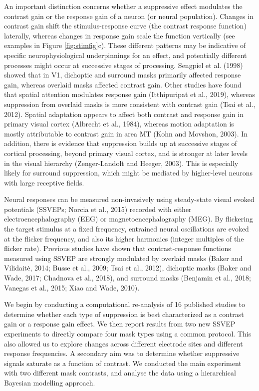 \documentclass[]{article}
\begin{document}
An important distinction concerns whether a suppressive effect modulates the contrast gain or the response gain of a neuron (or neural population). Changes in contrast gain shift the stimulus-response curve (the contrast response function) laterally, whereas changes in response gain scale the function vertically (see examples in Figure \ref{fig:stimfig}c). These different patterns may be indicative of specific neurophysiological underpinnings for an effect, and potentially different processes might occur at successive stages of processing. Sengpiel et al. (1998) showed that in V1, dichoptic and surround masks primarily affected response gain, whereas overlaid masks affected contrast gain. Other studies have found that spatial attention modulates response gain (Itthipuripat et al., 2019), whereas suppression from overlaid masks is more consistent with contrast gain (Tsai et al., 2012). Spatial adaptation appears to affect both contrast and response gain in primary visual cortex (Albrecht et al., 1984), whereas motion adaptation is mostly attributable to contrast gain in area MT (Kohn and Movshon, 2003). In addition, there is evidence that suppression builds up at successive stages of cortical processing, beyond primary visual cortex, and is stronger at later levels in the visual hierarchy (Zenger-Landolt and Heeger, 2003). This is especially likely for surround suppression, which might be mediated by higher-level neurons with large receptive fields.

Neural responses can be measured non-invasively using steady-state visual evoked potentials (SSVEPs; Norcia et al., 2015) recorded with either electroencephalography (EEG) or magnetoencephalography (MEG). By flickering the target stimulus at a fixed frequency, entrained neural oscillations are evoked at the flicker frequency, and also its higher harmonics (integer multiples of the flicker rate). Previous studies have shown that contrast-response functions measured using SSVEP are strongly modulated by overlaid masks (Baker and Vilidaitė, 2014; Busse et al., 2009; Tsai et al., 2012), dichoptic masks (Baker and Wade, 2017; Chadnova et al., 2018), and surround masks (Benjamin et al., 2018; Vanegas et al., 2015; Xiao and Wade, 2010).

We begin by conducting a computational re-analysis of 16 published studies to determine whether each type of suppression is best characterized as a contrast gain or a response gain effect. We then report results from two new SSVEP experiments to directly compare four mask types using a common protocol. This also allowed us to explore changes across different electrode sites and different response frequencies. A secondary aim was to determine whether suppressive signals saturate as a function of contrast. We conducted the main experiment with two different mask contrasts, and analyse the data using a hierarchical Bayesian modelling approach.
\end{document}
